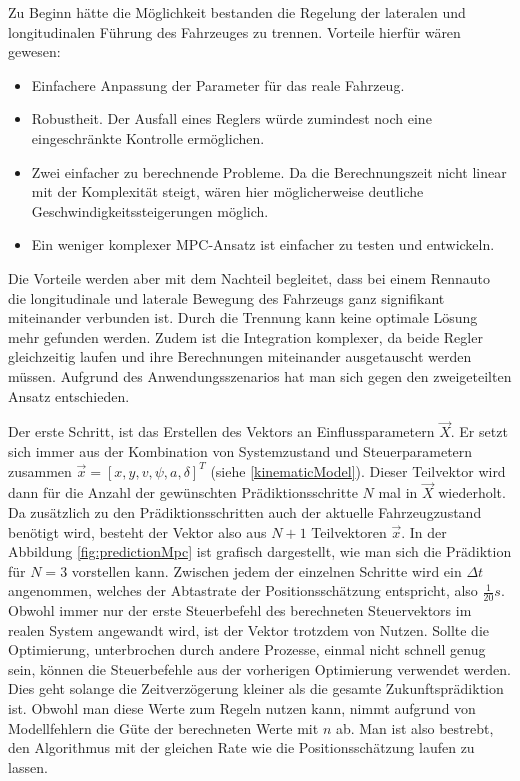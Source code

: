 \documentclass{like}
\begin{document}
Zu Beginn hätte die Möglichkeit bestanden die Regelung der lateralen und longitudinalen Führung des Fahrzeuges zu trennen. 
Vorteile hierfür wären gewesen:
\begin{itemize}
	\item Einfachere Anpassung der Parameter für das reale Fahrzeug.
	\item Robustheit. Der Ausfall eines Reglers würde zumindest noch eine eingeschränkte Kontrolle ermöglichen.
	\item Zwei einfacher zu berechnende Probleme. Da die Berechnungszeit nicht linear mit der Komplexität steigt, wären hier möglicherweise deutliche Geschwindigkeitssteigerungen möglich.
	\item Ein weniger komplexer \ac{MPC}-Ansatz ist einfacher zu testen und entwickeln.
\end{itemize}

Die Vorteile werden aber mit dem Nachteil begleitet, dass bei einem Rennauto die longitudinale und laterale Bewegung des Fahrzeugs ganz signifikant miteinander verbunden ist. Durch die Trennung kann keine optimale Lösung mehr gefunden werden. 
Zudem ist die Integration komplexer, da beide Regler gleichzeitig laufen und ihre Berechnungen miteinander ausgetauscht werden müssen.
Aufgrund des Anwendungsszenarios hat man sich gegen den zweigeteilten Ansatz entschieden.


Der erste Schritt, ist das Erstellen des Vektors an Einflussparametern $\vec{X}$. Er setzt sich immer aus der Kombination von Systemzustand und Steuerparametern zusammen  $\vec{x} = [x, y, v, \psi, a, \delta ]^T $ (siehe \ref{kinematicModel}). 
Dieser Teilvektor wird dann für die Anzahl der gewünschten Prädiktionsschritte \(N\) mal in $\vec{X}$ wiederholt. Da zusätzlich zu den Prädiktionsschritten auch der aktuelle Fahrzeugzustand benötigt wird, besteht der Vektor also aus $N+1$ Teilvektoren $\vec{x}$. In der Abbildung \ref{fig:predictionMpc} ist grafisch dargestellt, wie man sich die Prädiktion für $N=3$ vorstellen kann. Zwischen jedem der einzelnen Schritte wird ein $\Delta t$ angenommen, welches der Abtastrate der Positionsschätzung entspricht, also $\frac{1}{20} s$. Obwohl immer nur der erste Steuerbefehl des berechneten Steuervektors im realen System angewandt wird, ist der Vektor trotzdem von Nutzen. Sollte die Optimierung, unterbrochen durch andere Prozesse, einmal nicht schnell genug sein, können die Steuerbefehle aus der vorherigen Optimierung verwendet werden. Dies geht solange die Zeitverzögerung kleiner als die gesamte Zukunftsprädiktion ist. Obwohl man diese Werte zum Regeln nutzen kann, nimmt aufgrund von Modellfehlern die Güte der berechneten Werte mit \(n\) ab. Man ist also bestrebt, den Algorithmus mit der gleichen Rate wie die Positionsschätzung laufen zu lassen. 
\end{document}
